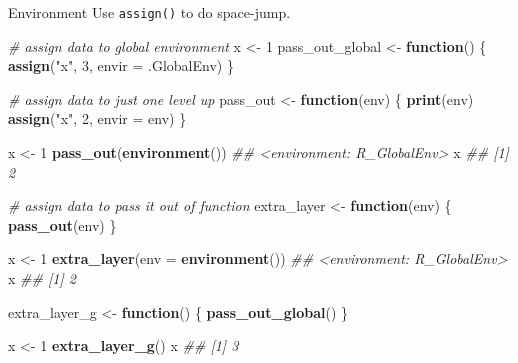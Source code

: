 \documentclass[
  10pt,
  ignorenonframetext,
  serif]{beamer}
\newenvironment{Shaded}{\begin{snugshade}}{\end{snugshade}}
\newcommand{\CommentTok}[1]{\textcolor[rgb]{0.56,0.35,0.01}{\textit{#1}}}
\newcommand{\ControlFlowTok}[1]{\textcolor[rgb]{0.13,0.29,0.53}{\textbf{#1}}}
\newcommand{\DataTypeTok}[1]{\textcolor[rgb]{0.13,0.29,0.53}{#1}}
\newcommand{\DecValTok}[1]{\textcolor[rgb]{0.00,0.00,0.81}{#1}}
\newcommand{\KeywordTok}[1]{\textcolor[rgb]{0.13,0.29,0.53}{\textbf{#1}}}
\newcommand{\NormalTok}[1]{#1}
\newcommand{\StringTok}[1]{\textcolor[rgb]{0.31,0.60,0.02}{#1}}
\begin{document}
\begin{frame}[fragile]{Environment}
\protect\hypertarget{environment-1}{}
Use \texttt{assign()} to do space-jump.

\begin{Shaded}
\begin{Highlighting}[]
\CommentTok{\# assign data to global environment}
\NormalTok{x \textless{}{-}}\StringTok{ }\DecValTok{1}
\NormalTok{pass\_out\_global \textless{}{-}}\StringTok{ }\ControlFlowTok{function}\NormalTok{() \{}
  \KeywordTok{assign}\NormalTok{(}\StringTok{"x"}\NormalTok{, }\DecValTok{3}\NormalTok{, }\DataTypeTok{envir =}\NormalTok{ .GlobalEnv)  }
\NormalTok{\}}

\CommentTok{\# assign data to just one level up }
\NormalTok{pass\_out \textless{}{-}}\StringTok{ }\ControlFlowTok{function}\NormalTok{(env) \{}
  \KeywordTok{print}\NormalTok{(env)}
  \KeywordTok{assign}\NormalTok{(}\StringTok{"x"}\NormalTok{, }\DecValTok{2}\NormalTok{, }\DataTypeTok{envir =}\NormalTok{ env)}
\NormalTok{\}}
\end{Highlighting}
\end{Shaded}

\begin{Shaded}
\begin{Highlighting}[]
\NormalTok{x \textless{}{-}}\StringTok{ }\DecValTok{1}
\KeywordTok{pass\_out}\NormalTok{(}\KeywordTok{environment}\NormalTok{())}
\CommentTok{\#\# \textless{}environment: R\_GlobalEnv\textgreater{}}
\NormalTok{x}
\CommentTok{\#\# [1] 2}

\CommentTok{\# assign data to pass it out of function}
\NormalTok{extra\_layer \textless{}{-}}\StringTok{ }\ControlFlowTok{function}\NormalTok{(env) \{}
  \KeywordTok{pass\_out}\NormalTok{(env)}
\NormalTok{\}}

\NormalTok{x \textless{}{-}}\StringTok{ }\DecValTok{1}
\KeywordTok{extra\_layer}\NormalTok{(}\DataTypeTok{env =} \KeywordTok{environment}\NormalTok{())}
\CommentTok{\#\# \textless{}environment: R\_GlobalEnv\textgreater{}}
\NormalTok{x}
\CommentTok{\#\# [1] 2}

\NormalTok{extra\_layer\_g \textless{}{-}}\StringTok{ }\ControlFlowTok{function}\NormalTok{() \{}
  \KeywordTok{pass\_out\_global}\NormalTok{()}
\NormalTok{\}}

\NormalTok{x \textless{}{-}}\StringTok{ }\DecValTok{1}
\KeywordTok{extra\_layer\_g}\NormalTok{()}
\NormalTok{x}
\CommentTok{\#\# [1] 3}
\end{Highlighting}
\end{Shaded}
\end{frame}
\end{document}
